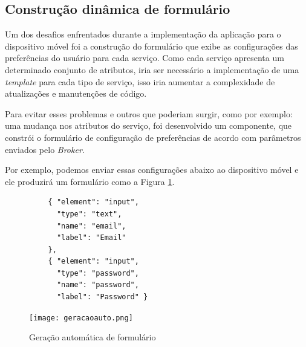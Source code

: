 \subsection{Construção dinâmica de formulário}
Um dos desafios enfrentados durante a implementação da aplicação para o dispositivo móvel foi a construção do formulário que exibe as configurações das preferências do usuário para cada serviço. Como cada serviço apresenta um determinado conjunto de atributos, iria ser necessário a implementação de uma \textit{template} para cada tipo de serviço, isso iria aumentar a complexidade de atualizações e manutenções de código.

Para evitar esses problemas e outros que poderiam surgir, como por exemplo: uma mudança nos atributos do serviço, foi desenvolvido um componente, que constrói o formulário de configuração de preferências de acordo com parâmetros enviados pelo \textit{Broker}.

Por exemplo, podemos enviar essas configurações abaixo ao dispositivo móvel e ele produzirá um formulário como a Figura \ref{fig:geracaoauto}.
\begin{footnotesize}
  \begin{verbatim}
          { "element": "input",
            "type": "text",
            "name": "email",
            "label": "Email"
          },
          { "element": "input",
            "type": "password",
            "name": "password",
            "label": "Password" }
  \end{verbatim}
\end{footnotesize}

\begin{figure}[!htb]
  \centering
  \texttt{[image: geracaoauto.png]} %
  \caption[Geração automática de formulário]{Geração automática de formulário}
  \label{fig:geracaoauto}
\end{figure}

